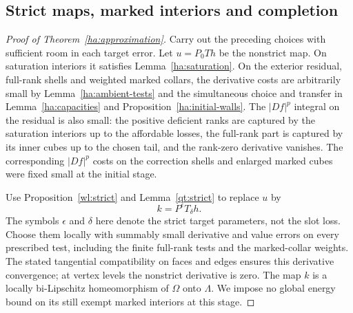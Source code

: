 \documentclass[11pt]{article}
\numberwithin{equation}{section}
\theoremstyle{definition}
\theoremstyle{remark}
\begin{document}
\subsection{Strict maps, marked interiors and completion}
\label{ha:completion}

\begin{proof}[Proof of Theorem~\ref{ha:approximation}]
Carry out the preceding choices with sufficient room in each target
error.  Let $u=P_0Th$ be the nonstrict map.  On saturation interiors
it satisfies Lemma~\ref{ha:saturation}.  On the exterior residual,
full-rank shells and weighted marked collars, the derivative costs
are arbitrarily small by Lemma~\ref{ha:ambient-tests} and the
simultaneous choice and transfer in Lemma~\ref{ha:capacities} and
Proposition~\ref{ha:initial-walls}.  The $|Df|^p$
integral on the residual is also small: the positive deficient ranks
are captured by the saturation interiors up to the affordable
losses, the full-rank part is captured by its inner cubes up to the
chosen tail, and the rank-zero derivative vanishes.  The corresponding
$|Df|^p$ costs on the correction shells and enlarged marked cubes
were fixed small at the initial stage.

Use Proposition~\ref{wl:strict} and Lemma~\ref{qt:strict} to
replace $u$ by
\[
                            k=P^\epsilon T_\delta h.
\]
The symbols $\epsilon$ and $\delta$ here denote the strict target
parameters, not the slot loss.  Choose them locally with summably
small derivative and value errors on every prescribed test, including
the finite full-rank tests and the marked-collar weights.  The stated
tangential compatibility on faces and edges ensures this derivative
convergence; at vertex levels the nonstrict derivative is zero.
The map $k$ is a locally bi-Lipschitz homeomorphism of $\Omega$ onto
$\Lambda$.  We impose no global energy bound on its still exempt
marked interiors at this stage.


\end{proof}
\end{document}
